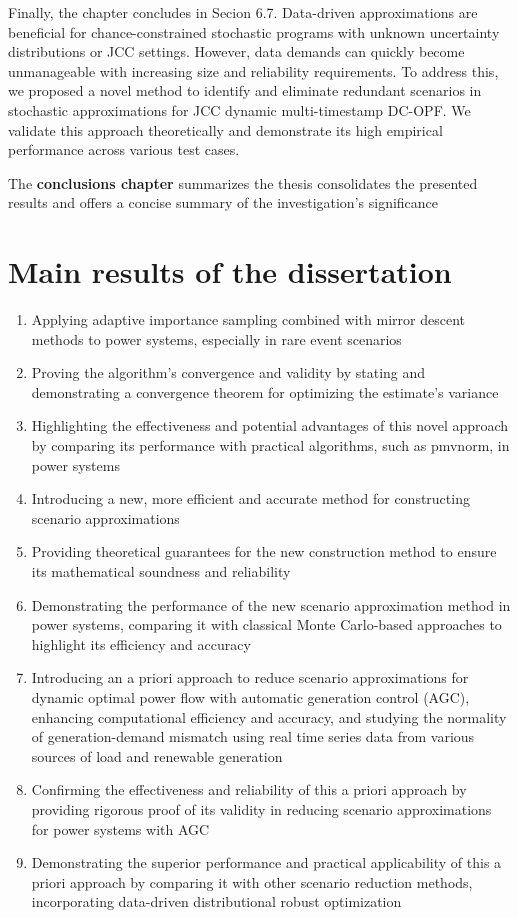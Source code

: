 
Finally, the chapter concludes in Secion 6.7. Data-driven approximations are beneficial for chance-constrained stochastic programs with unknown uncertainty distributions or JCC settings. However, data demands can quickly become unmanageable with increasing size and reliability requirements. To address this, we proposed a novel method to identify and eliminate redundant scenarios in stochastic approximations for JCC dynamic multi-timestamp DC-OPF. We validate this approach theoretically and demonstrate its high empirical performance across various test cases.

The \textbf{conclusions chapter} summarizes the thesis consolidates the presented results and offers a concise summary of the investigation’s significance
\section*{Main results of the dissertation}
\begin{enumerate}
    \item Applying adaptive importance sampling combined with mirror descent methods to power systems, especially in rare event scenarios
\item Proving the algorithm's convergence and validity by stating and demonstrating a convergence theorem for optimizing the estimate's variance
\item Highlighting the effectiveness and potential advantages of this novel approach by comparing its performance with practical algorithms, such as pmvnorm, in power systems
\item Introducing a new, more efficient and accurate method for constructing scenario approximations
\item Providing theoretical guarantees for the new construction method to ensure its mathematical soundness and reliability
\item Demonstrating the performance of the new scenario approximation method in power systems, comparing it with classical Monte Carlo-based approaches to highlight its efficiency and accuracy
\item Introducing an a priori approach to reduce scenario approximations for dynamic optimal power flow with automatic generation control (AGC), enhancing computational efficiency and accuracy, and studying the normality of generation-demand mismatch using real time series data from various sources of load and renewable generation
\item Confirming the effectiveness and reliability of this a priori approach by providing rigorous proof of its validity in reducing scenario approximations for power systems with AGC
\item Demonstrating the superior performance and practical applicability of this a priori approach by comparing it with other scenario reduction methods, incorporating data-driven distributional robust optimization
\end{enumerate}